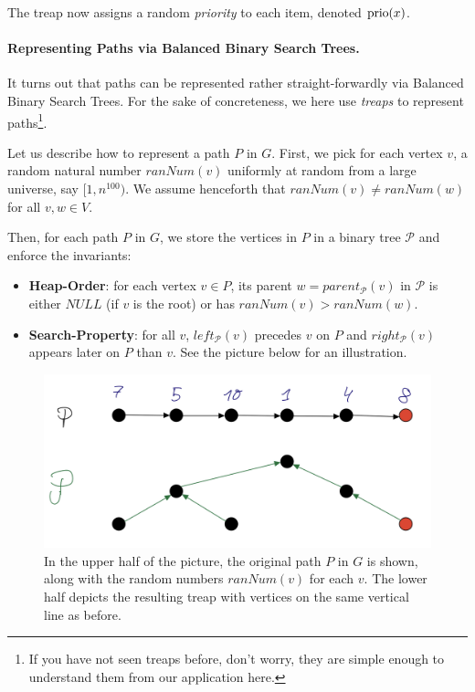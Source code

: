 The treap now assigns a random \emph{priority} to each item, denoted $\operatorname{prio}(x)$.

\paragraph{Representing Paths via Balanced Binary Search Trees.} It turns out that paths can be represented rather straight-forwardly via Balanced Binary Search Trees. For the sake of concreteness, we here use \emph{treaps} to represent paths\footnote{If you have not seen treaps before, don't worry, they are simple enough to understand them from our application here. }. 

Let us describe how to represent a path $P$ in $G$. First, we pick for each vertex $v$, a random natural number $ranNum(v)$ uniformly at random from a large universe, say $[1, n^{100})$. We assume henceforth that $ranNum(v) \neq ranNum(w)$ for all $v,w\in V$.

Then, for each path $P$ in $G$, we store the vertices in $P$ in a binary tree $\mathcal{P}$ and enforce the invariants:
\begin{itemize}
    \item \textbf{Heap-Order}: for each vertex $v \in P$, its parent $w = parent_{\mathcal{P}}(v)$ in $\mathcal{P}$ is either $NULL$ (if $v$ is the root) or has $ranNum(v) > ranNum(w)$.
    \item \textbf{Search-Property}: for all $v$, $left_{\mathcal{P}}(v)$ precedes $v$ on $P$ and $right_{\mathcal{P}}(v)$ appears later on $P$ than $v$. See the picture below for an illustration.
\end{itemize}

\begin{figure}[!ht]
    \centering
    \includegraphics[scale=0.2]{./fig/PathRepTreap_lectureDynamicTree.jpeg}
    \caption{In the upper half of the picture, the original path $P$ in $G$ is shown, along with the random numbers $ranNum(v)$ for each $v$. The lower half depicts the resulting treap with vertices on the same vertical line as before.}
    \label{fig:my_label}
\end{figure}

